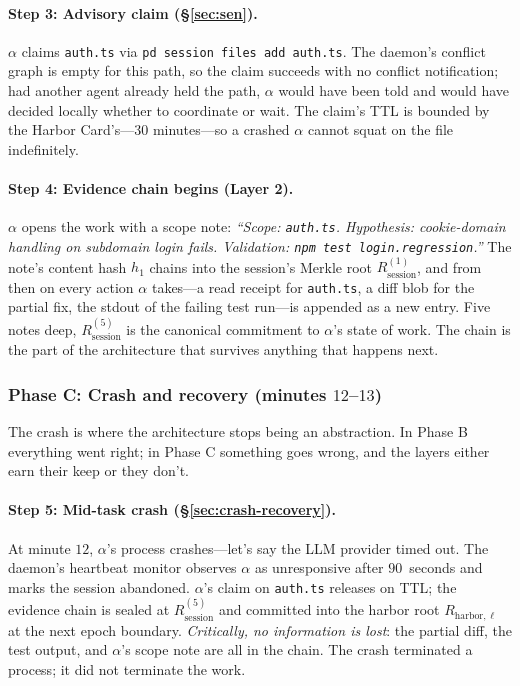 \documentclass[11pt,a4paper]{article}
\theoremstyle{definition}
\theoremstyle{remark}
\begin{document}
\paragraph{Step 3: Advisory claim (\S\ref{sec:sen}).} $\alpha$ claims \texttt{auth.ts} via \texttt{pd session files add auth.ts}. The daemon's conflict graph is empty for this path, so the claim succeeds with no conflict notification; had another agent already held the path, $\alpha$ would have been told and would have decided locally whether to coordinate or wait. The claim's TTL is bounded by the Harbor Card's---$30$ minutes---so a crashed $\alpha$ cannot squat on the file indefinitely.

\paragraph{Step 4: Evidence chain begins (Layer 2).} $\alpha$ opens the work with a scope note: \emph{``Scope: \texttt{auth.ts}. Hypothesis: cookie-domain handling on subdomain login fails. Validation: \texttt{npm test login.regression}.''} The note's content hash $h_1$ chains into the session's Merkle root $R_{\text{session}}^{(1)}$, and from then on every action $\alpha$ takes---a read receipt for \texttt{auth.ts}, a diff blob for the partial fix, the stdout of the failing test run---is appended as a new entry. Five notes deep, $R_{\text{session}}^{(5)}$ is the canonical commitment to $\alpha$'s state of work. The chain is the part of the architecture that survives anything that happens next.

\subsubsection*{Phase C: Crash and recovery (minutes $12$--$13$)}

The crash is where the architecture stops being an abstraction. In Phase B everything went right; in Phase C something goes wrong, and the layers either earn their keep or they don't.

\paragraph{Step 5: Mid-task crash (\S\ref{sec:crash-recovery}).} At minute $12$, $\alpha$'s process crashes---let's say the LLM provider timed out. The daemon's heartbeat monitor observes $\alpha$ as unresponsive after $90$~seconds and marks the session abandoned. $\alpha$'s claim on \texttt{auth.ts} releases on TTL; the evidence chain is sealed at $R_{\text{session}}^{(5)}$ and committed into the harbor root $R_{\text{harbor},\ell}$ at the next epoch boundary. \emph{Critically, no information is lost}: the partial diff, the test output, and $\alpha$'s scope note are all in the chain. The crash terminated a process; it did not terminate the work.
\end{document}
